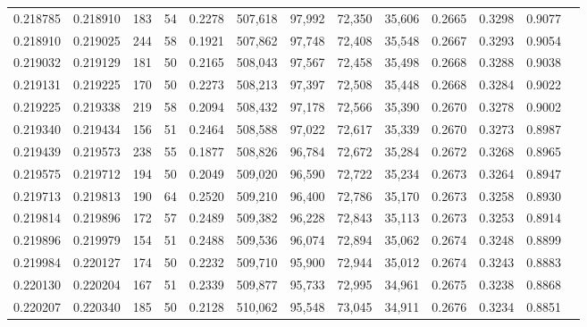 \begin{tabular}{rrrrrrrrrrrrr}
0.218785 & 0.218910 &   183 &  54 &                                     0.2278 & 507,618 &  97,992 &  72,350 &  35,606 & 0.2665 & 0.3298 & 0.9077 \\
0.218910 & 0.219025 &   244 &  58 &                                     0.1921 & 507,862 &  97,748 &  72,408 &  35,548 & 0.2667 & 0.3293 & 0.9054 \\
0.219032 & 0.219129 &   181 &  50 &                                     0.2165 & 508,043 &  97,567 &  72,458 &  35,498 & 0.2668 & 0.3288 & 0.9038 \\
0.219131 & 0.219225 &   170 &  50 &                                     0.2273 & 508,213 &  97,397 &  72,508 &  35,448 & 0.2668 & 0.3284 & 0.9022 \\
0.219225 & 0.219338 &   219 &  58 &                                     0.2094 & 508,432 &  97,178 &  72,566 &  35,390 & 0.2670 & 0.3278 & 0.9002 \\
0.219340 & 0.219434 &   156 &  51 &                                     0.2464 & 508,588 &  97,022 &  72,617 &  35,339 & 0.2670 & 0.3273 & 0.8987 \\
0.219439 & 0.219573 &   238 &  55 &                                     0.1877 & 508,826 &  96,784 &  72,672 &  35,284 & 0.2672 & 0.3268 & 0.8965 \\
0.219575 & 0.219712 &   194 &  50 &                                     0.2049 & 509,020 &  96,590 &  72,722 &  35,234 & 0.2673 & 0.3264 & 0.8947 \\
0.219713 & 0.219813 &   190 &  64 &                                     0.2520 & 509,210 &  96,400 &  72,786 &  35,170 & 0.2673 & 0.3258 & 0.8930 \\
0.219814 & 0.219896 &   172 &  57 &                                     0.2489 & 509,382 &  96,228 &  72,843 &  35,113 & 0.2673 & 0.3253 & 0.8914 \\
0.219896 & 0.219979 &   154 &  51 &                                     0.2488 & 509,536 &  96,074 &  72,894 &  35,062 & 0.2674 & 0.3248 & 0.8899 \\
0.219984 & 0.220127 &   174 &  50 &                                     0.2232 & 509,710 &  95,900 &  72,944 &  35,012 & 0.2674 & 0.3243 & 0.8883 \\
0.220130 & 0.220204 &   167 &  51 &                                     0.2339 & 509,877 &  95,733 &  72,995 &  34,961 & 0.2675 & 0.3238 & 0.8868 \\
0.220207 & 0.220340 &   185 &  50 &                                     0.2128 & 510,062 &  95,548 &  73,045 &  34,911 & 0.2676 & 0.3234 & 0.8851 \\

\end{tabular}
